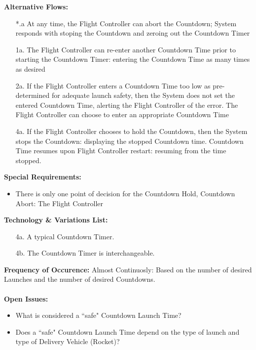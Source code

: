 \documentclass[letterpaper]{article}
\begin{document}
\textbf{Alternative Flows:}
\begin{itemize}
\item[*.a]At any time, the Flight Controller can abort the Countdown;
System responds with stoping the Countdown and zeroing out the
Countdown Timer
\item[1a.]The Flight Controller can re-enter another Countdown Time
prior to starting the Countdown Timer:  entering the Countdown Time
as many times as desired
\item[2a.]If the Flight Controller enters a Countdown Time too low as
pre-determined for adequate launch safety, then the System does not
set the entered Countdown Time, alerting the Flight Controller of the
error.  The Flight Controller can choose to enter an appropriate
Countdown Time
\item[4a.]If the Flight Controller chooses to hold the Countdown, then
the System stops the Countdown: displaying the stopped Countdown time.
Countdown Time resumes upon Flight Controller restart:  resuming from
the time stopped.
\end{itemize}
\textbf{Special Requirements:}
\begin{itemize}
\item  There is only one point of decision for the Countdown Hold,
Countdown Abort:  The Flight Controller
\end{itemize}
\textbf{Technology \& Variations List:}
\begin{itemize}
\item[4a.] A typical Countdown Timer.
\item[4b.] The Countdown Timer is interchangeable.
\end{itemize}
\textbf{Frequency of Occurence:  }Almost Continuosly:  Based on the
number of desired Launches and the number of desired Countdowns.\\\\
\textbf{Open Issues:}
\begin{itemize}
\item What is considered a ``safe" Countdown Launch Time?
\item Does a ``safe" Countdown Launch Time depend on the type of
launch and type of Delivery Vehicle (Rocket)?
\end{itemize}
\end{document}

